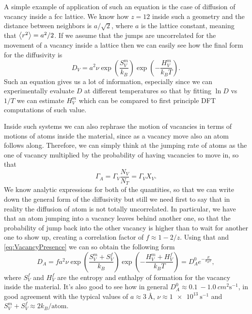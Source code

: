 {
    A simple example of application of such an equation is the case of diffusion of vacancy inside a fcc lattice. We know how $z = 12$ inside such a geometry and the distance between neighbors is $a/\sqrt{2}$, where $a$ is the lattice constant, meaning that $\left\langle r^2 \right\rangle = a^2/2$. If we assume that the jumps are uncorrelated for the movement of a vacancy inside a lattice then we can easily see how the final form for the diffusivity is
    \begin{equation}
        D_V = a^2 \nu \exp\left( \frac{S^m_V}{k_B} \right)\exp\left( -\frac{H^m_V}{k_BT} \right).
    \end{equation}
    Such an equation gives us a lot of information, especially since we can experimentally evaluate $D$ at different temperatures so that by fitting $\ln D$ vs $1/T$ we can estimate $H^m_V$ which can be compared to first principle DFT computations of such value.

    Inside such systems we can also rephrase the motion of vacancies in terms of motions of atoms inside the material, since as a vacancy move also an atom follows along. Therefore, we can simply think at the jumping rate of atoms as the one of vacancy multiplied by the probability of having vacancies to move in, so that
    \begin{equation}
        \Gamma_A = \Gamma_V \frac{N_V}{N_T} = \Gamma_V X_V.
    \end{equation}
    We know analytic expressions for both of the quantities, so that we can write down the general form of the diffusivity but still we need first to say that in reality the diffusion of atom is not totally uncorrelated. In particular, we have that an atom jumping into a vacancy leaves behind another one, so that the probability of jump back into the other vacancy is higher than to wait for another one to show up, creating a correlation factor of $f \approx 1 - 2/z$. Using that and \eqref{eq:VacancyPresence} we can so obtain the following form
    \begin{equation}
        D_A = fa^2\nu\exp\left( \frac{S_V^m + S_V^f}{k_B} \right)\exp\left( -\frac{H_V^m + H_V^f}{k_BT} \right) = D_A^0e^{-\frac{E}{k_BT}},
    \end{equation}
    where $S_V^f$ and $H_V^f$ are the entropy and enthalpy of formation for the vacancy inside the material. It's also good to see how in general $D_A^0 \approx \SI{0.1}{}-\SI{1.0}{cm^2\second^{-1}}$, in good agreement with the typical values of $a \approx \SI{3}{\angstrom}$, $\nu \approx \SI{1e13}{\second^{-1}}$ and $S_V^m + S_V^f \approx 2k_B/\text{atom}$. 
}
